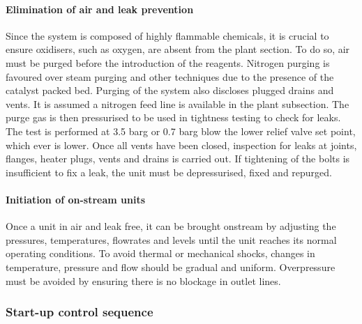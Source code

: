 \paragraph{Elimination of air and leak prevention}
Since the system is composed of highly flammable chemicals, it is crucial to ensure oxidisers, such as oxygen, are absent from the plant section. To do so, air must be purged before the introduction of the reagents. Nitrogen purging is favoured over steam purging and other techniques due to the presence of the catalyst packed bed. Purging of the system also discloses plugged drains and vents. It is assumed a nitrogen feed line is available in the plant subsection. 
The purge gas is then pressurised to be used in tightness testing to check for leaks. The test is performed at 3.5 barg or 0.7 barg blow the lower relief valve set point, which ever is lower. Once all vents have been closed, inspection for leaks at joints, flanges, heater plugs, vents and drains is carried out. If tightening of the bolts is insufficient to fix a leak, the unit must be depressurised, fixed and repurged.

\paragraph{Initiation of on-stream units}
Once a unit in air and leak free, it can be brought onstream by adjusting the pressures, temperatures, flowrates and levels until the unit reaches its normal operating conditions. To avoid thermal or mechanical shocks, changes in temperature, pressure and flow should be gradual and uniform. Overpressure must be avoided by ensuring there is no blockage in outlet lines.


\subsubsection{Start-up control sequence}


